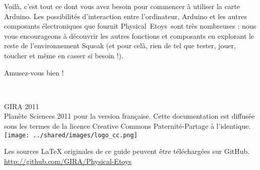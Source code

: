 \documentclass[a4paper,12pt]{article}
\def\appName{Physical~Etoys~}
\begin{document}
Voilà, c'est tout ce dont vous avez besoin pour commencer à utiliser la carte
Arduino. Les possibilités d'interaction entre l'ordinateur, Arduino et les
autres composants électroniques que fournit \appName sont très nombreuses : nous
vous encourageons à découvrir les autres fonctions et composants en explorant
le reste de l'environnement Squeak (et pour celà, rien de tel que tester,
jouer, toucher et même en casser si besoin !).

Amusez-vous bien !

\printglossaries

\clearpage
\thispagestyle{empty}
~
\vfill
\begin{center}
        GIRA 2011\\
        Planète Sciences 2011 pour la version française.
        Cette documentation est diffusée sous les termes de la licence Creative Commons Paternité-Partage à l'identique.\\
        \vspace{2cm}
        \texttt{[image: ../shared/images/logo\_cc.png]}
\end{center}

\vfill

\begin{center}
        Les sources LaTeX originales de ce guide peuvent être téléchargées sur GitHub.
        \url{http://github.com/GIRA/Physical-Etoys}
\end{center}

\vfill
\end{document}
